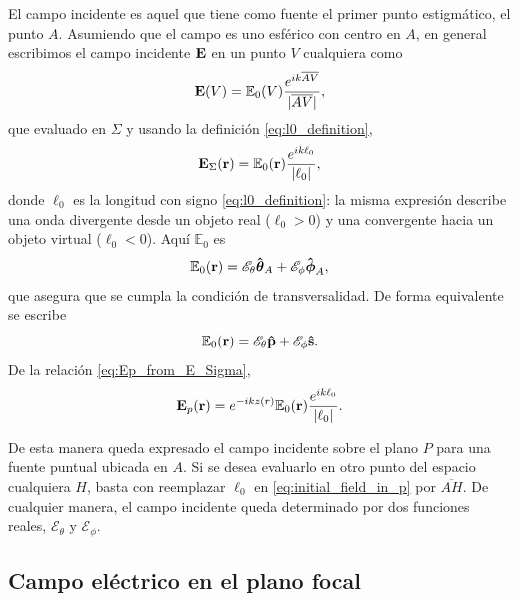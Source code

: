 El campo incidente es aquel que tiene como fuente el primer punto estigmático, el punto $A$. Asumiendo que el campo es uno esférico con centro en $A$, en general escribimos el campo incidente $\vb E$ en un punto $V$ cualquiera como
\begin{equation}
  \vb E (V)
  =
  \mathbb{E}_0(V)
  \frac{e^{ik\overline{AV}}}{|\overline{AV}|},
  \label{eq:initial_field}
\end{equation}
que evaluado en $\Sigma$ y usando la definición \eqref{eq:l0_definition},
\begin{equation}
  \vb E_\Sigma (\vb r)
  =
  \mathbb{E}_0(\vb r)
  \frac{e^{ik\ell_0}}{|\ell_0|},
  \label{eq:initial_field_sigma}
\end{equation}
donde $\ell_0$ es la longitud con signo \eqref{eq:l0_definition}: la misma
expresión describe una onda divergente desde un objeto real ($\ell_0>0$) y
una convergente hacia un objeto virtual ($\ell_0<0$). Aquí $\mathbb E_0$ es
\begin{equation}
  \mathbb E_0 (\vb r)
  =
  \mathscr E_\theta \bm{\hat{\mathbf{\theta}}}_A
  +
  \mathscr E_\phi \bm{\hat{\mathbf{\phi}}}_A,
  \label{eq:mathbb_E_0_definition}
\end{equation}
que asegura que se cumpla la condición de transversalidad. De forma equivalente se escribe
\begin{equation}
  \mathbb E_0 (\vb r)
  =
  \mathscr E_\theta \bm{\hat{\mathbf{p}}}
  +
  \mathscr E_\phi \bm{\hat{\mathbf{s}}}.
  \label{eq:mathbb_E_0_definition_ps}
\end{equation}
De la relación \eqref{eq:Ep_from_E_Sigma},
\begin{equation}
  \vb E_p (\vb r)
  =
  e^{-ikz(r)}
  \mathbb{E}_0(\vb r)
  \frac{e^{ik\ell_0}}{|\ell_0|}.
  \label{eq:initial_field_in_p}
\end{equation}

De esta manera queda expresado el campo incidente sobre el plano $P$ para una fuente puntual ubicada en $A$. Si se desea evaluarlo en otro punto del espacio cualquiera $H$, basta con reemplazar $\ell_0$ en \eqref{eq:initial_field_in_p} por $\overline{AH}$. De cualquier manera, el campo incidente queda determinado por dos funciones reales, $\mathscr E_\theta$ y $\mathscr E_\phi$.

\subsection{Campo eléctrico en el plano focal}

